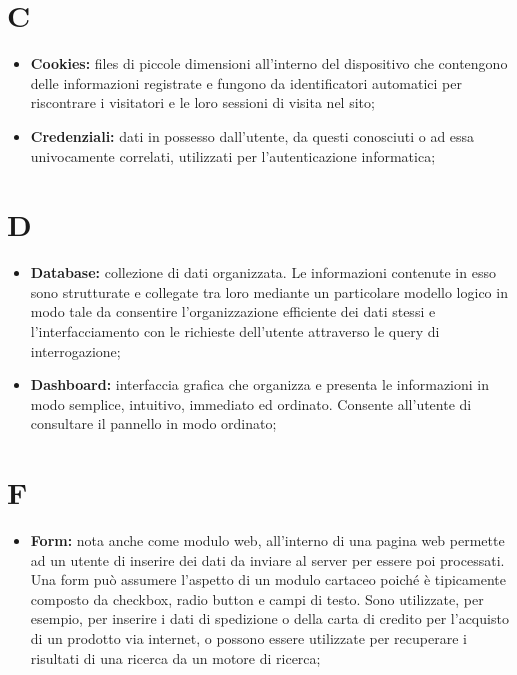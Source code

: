 	\section*{\Huge C} %
		\begin{itemize}
			\item \textbf{Cookies:} files di piccole dimensioni all'interno del dispositivo che contengono delle informazioni registrate e fungono da identificatori automatici per riscontrare i visitatori e le loro sessioni di visita nel sito;
			\item \textbf{Credenziali:} dati in possesso dall'utente, da questi conosciuti o ad essa univocamente correlati, utilizzati per l'autenticazione informatica;
		\end{itemize}

	\section*{\Huge D} %
		\begin{itemize}
			\item \textbf{Database:} collezione di dati organizzata. Le informazioni contenute in esso sono strutturate e collegate tra loro mediante un particolare modello logico in modo tale da consentire l'organizzazione efficiente dei dati stessi e l'interfacciamento con le richieste dell'utente attraverso le query di interrogazione;
			\item \textbf{Dashboard:} interfaccia grafica che organizza e presenta le informazioni in modo semplice, intuitivo, immediato ed ordinato. Consente all'utente di consultare il pannello in modo ordinato;
		\end{itemize}

	\section*{\Huge F} %
		\begin{itemize}
			\item \textbf{Form:} nota anche come modulo web, all'interno di una pagina web permette ad un utente di inserire dei dati da inviare al server per essere poi processati. Una form può assumere l'aspetto di un modulo cartaceo poiché è tipicamente composto da checkbox, radio button e campi di testo. Sono utilizzate, per esempio, per inserire i dati di spedizione o della carta di credito per l'acquisto di un prodotto via internet, o possono essere utilizzate per recuperare i risultati di una ricerca da un motore di ricerca;
		\end{itemize}

